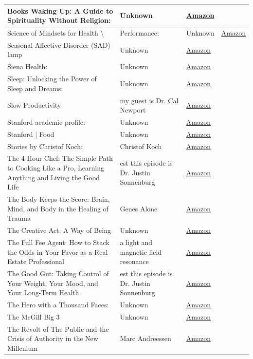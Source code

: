 \documentclass{article}
\begin{document}
\begin{longtable}{|p{8cm}|p{4cm}|p{2.5cm}|}
Books
Waking Up: A Guide to Spirituality Without Religion: & Unknown & \href{https://amzn.to/3CgbIQ3}{Amazon} \\
\hline
Science of Mindsets for Health \textbackslash{}& Performance: & Unknown & \href{https://amzn.to/3FCgKYk}{Amazon} \\
\hline
Seasonal Affective Disorder (SAD) lamp & Unknown & \href{https://amzn.to/3FzKfdm}{Amazon} \\
\hline
Siena Health: & Unknown & \href{https://www.amazon.com/Biotin-Hair-Shampoo-Thinning-Moisturizing/dp/B01ENCBOA0}{Amazon} \\
\hline
Sleep: Unlocking the Power of Sleep and Dreams: & Unknown & \href{https://amzn.to/3bEbpVc}{Amazon} \\
\hline
Slow Productivity & my guest is Dr. Cal Newport & \href{https://amzn.to/49QzG35}{Amazon} \\
\hline
Stanford academic profile: & Unknown & \href{https://amzn.to/4gxYosS}{Amazon} \\
\hline
Stanford | Food & Unknown & \href{https://amzn.to/4kgH4ZZ}{Amazon} \\
\hline
Stories by Christof Koch: & Christof Koch & \href{https://amzn.to/42tLC9a}{Amazon} \\
\hline
The 4-Hour Chef: The Simple Path to Cooking Like a Pro, Learning Anything and Living the Good Life & est this episode is Dr. Justin Sonnenburg & \href{https://amzn.to/3hqxkP0}{Amazon} \\
\hline
The Body Keeps the Score: Brain, Mind, and Body in the Healing of Trauma & Genes Alone & \href{https://amzn.to/3rUQyVO}{Amazon} \\
\hline
The Creative Act: A Way of Being & Unknown & \href{https://amzn.to/48qgkAA}{Amazon} \\
\hline
The Full Fee Agent: How to Stack the Odds in Your Favor as a Real Estate Professional & a light and magnetic field resonance & \href{https://amzn.to/3Nhe9Hp}{Amazon} \\
\hline
The Good Gut: Taking Control of Your Weight, Your Mood, and Your Long-Term Health & est this episode is Dr. Justin Sonnenburg & \href{https://amzn.to/35RQP0c}{Amazon} \\
\hline
The Hero with a Thousand Faces: & Unknown & \href{https://amzn.to/4cGSDHr}{Amazon} \\
\hline
The McGill Big 3 & Unknown & \href{https://amzn.to/3JBDNV4}{Amazon} \\
\hline
The Revolt of The Public and the Crisis of Authority in the New Millenium & Marc Andreessen & \href{https://amzn.to/45BqNYW}{Amazon} \\

\end{longtable}
\end{document}
